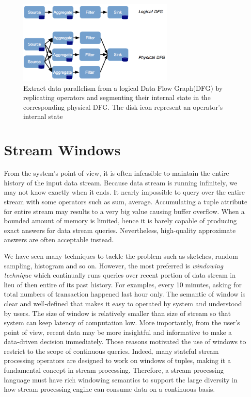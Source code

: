 \begin{figure}[htbp!] 
\centering    
\includegraphics[width=0.7\textwidth]{logicalPhysicalDataFlow}
\caption[Logical and Physical Stream]{Extract data parallelism from a logical Data Flow Graph(DFG) by replicating operators and segmenting their internal state in the corresponding physical DFG. The disk icon represent an operator's internal state~\citep{Henrique:2013}}
\label{fig:streamRepresent}
\end{figure}

   
    
    
\section{Stream Windows}

From the system's point of view, it is often infeasible to maintain the entire history of the input data stream. Because data stream is running infinitely, we may not know exactly when it ends. It nearly impossible to query over the entire stream with some operators such as sum, average. Accumulating a tuple attribute for entire stream may results to a very big value causing  buffer overflow.  When a bounded amount of memory is limited, hence it is barely capable of producing exact answers for data stream queries. Nevertheless, high-quality approximate answers are often acceptable instead. 

We have seen many techniques to tackle the problem such as sketches, random sampling, histogram and so on. However, the most preferred is \textit{windowing technique} which continually runs queries over recent portion of data stream  in lieu of then entire of its past history. For examples, every 10 minutes, asking for total numbers of transaction happened last hour only. The semantic of window is clear and well-defined that makes it easy to operated by system and understood by users. The size of window is relatively smaller than size of stream so that system can keep latency of computation low.  More importantly, from the user's point of view, recent data may be more insightful and informative to make a data-driven decision immediately. Those reasons motivated the use of windows to restrict to the scope of continuous queries. Indeed, many stateful stream processing operators are designed to work on windows of tuples, making it a fundamental concept in stream processing. Therefore, a stream processing language must have rich windowing semantics to support the large diversity in how stream processing engine can consume data on a continuous basis.


